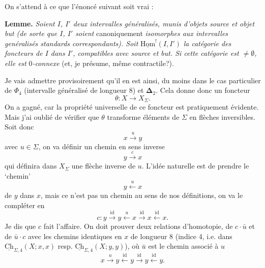 \documentclass[11pt]{article}
\newcommand{\printedpage}[1]{\marginpar{\footnotesize p.~#1}}
\newcommand{\msp}[1]{\marginpar{\footnotesize [#1]}}
\newcommand{\uHom}{\underline{\mathrm{Hom}}}
\newcommand{\bDelta}{\boldsymbol{\Delta}}
\newcommand{\uCh}{\underline{\mathrm{Ch}}}
\begin{document}
On s'attend à ce que l'énoncé suivant soit vrai :

\textbf{Lemme.} \textit{Soient $I$, $I'$ deux intervalles généralisés, munis d'objets source et objet but (de sorte que $I$, $I'$ soient} canoniquement \textit{isomorphes aux intervalles genéralisés standards correspondants). Soit} $\uHom^!(I,I')$ %
\msp{page 26}\textit{la catégorie des foncteurs de $I$ dans $I'$, compatibles avec source et but. Si cette catégorie est $\neq \emptyset$, elle est} 0\textit{-connexe} (et, je présume, même contractile?).

Je vais admettre provisoirement qu'il en est ainsi, du moins dans le cas particulier de $\Phi_4$ (intervalle généralisé de longueur 8) et $\bDelta_2$. Cela donne donc un foncteur
\[
\theta : X \longrightarrow X_\Sigma.
\]
On a gagné, car la propriété universelle de ce foncteur est pratiquement évidente. Mais j'ai oublié de vérifier que $\theta$ transforme éléments de $\Sigma$ en flèches inversibles. Soit donc
\[
x \xrightarrow{u} y
\]
avec $u \in \Sigma$, on va définir un chemin en sens inverse
\[
y \xrightarrow{c} x
\]
qui définira dans $X_\Sigma$ une flèche inverse de $u$. L'idée naturelle est de prendre le `chemin'
\[
y \xleftarrow{u} x
\]
\printedpage{17}
de $y$ dans $x$, mais ce n'est pas un chemin au sens de nos définitions, on va le compléter en
\[
c : y \xrightarrow{\mathrm{id}} y \xleftarrow{u} x \xrightarrow{\mathrm{id}} x \xleftarrow{\mathrm{id}} x.
\]
Je dis que $c$ fait l'affaire. On doit prouver deux relations d'homotopie, de $c \cdot \bar{u}$ et de $\bar{u} \cdot c$ avec les chemins identiques en $x$ de longueur 8 (indice 4, i.e. dans $\uCh_{\Sigma,4}(X;x,x)$ resp. $\uCh_{\Sigma,4}(X;y,y)$),
\msp{page 27}où $\bar{u}$ est le chemin associé à $u$
\[
x \xrightarrow{u} y \xleftarrow{\mathrm{id}} y \xrightarrow{\mathrm{id}} y \xleftarrow{\mathrm{id}} y.
\]
\end{document}
